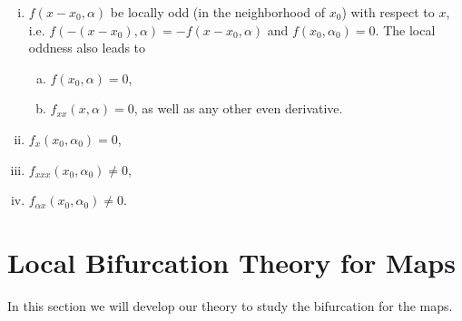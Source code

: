 \begin{enumerate}[(i)]
	\item $f(x-x_0,\alpha)$ be locally odd (in the neighborhood of $x_0$) with respect to $x$, i.e. $f(-(x-x_0),\alpha) = - f(x-x_0,\alpha)$ and $f(x_0,\alpha_0) =0 $. The local oddness also leads to 
	\begin{enumerate}[(a)]
		\item $f(x_0,\alpha) = 0$,
		\item $f_{xx}(x,\alpha)=0$, as well as any other even derivative.
	\end{enumerate} 
	\item $f_x(x_0,\alpha_0) =0$,
	\item $f_{xxx}(x_0,\alpha_0) \neq 0$,
	\item $f_{\alpha x} (x_0,\alpha_0) \neq 0$.
\end{enumerate}


\section{Local Bifurcation Theory for Maps}
In this section we will develop our theory to study the bifurcation for the maps.

